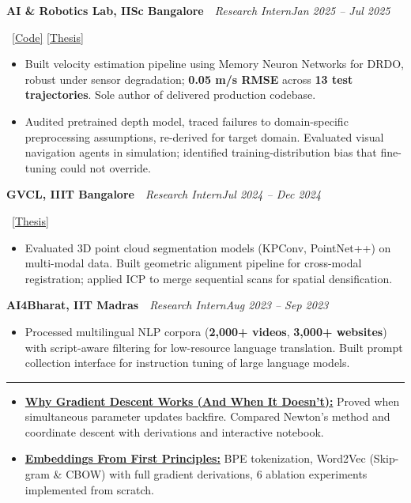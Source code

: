 \documentclass[10pt,a4paper]{article}
\newcommand{\cvsep}{\ \textemdash\ }
\newcommand{\cvsection}[1]{%
  \par\vspace{6.4pt}%
  \noindent{\normalsize\bfseries #1}\par\vspace{-8.6pt}%
  \noindent\rule{\textwidth}{0.4pt}\par\vspace{-2.4pt}%
}
\newcommand{\cvrole}[3]{%
  \par\vspace{1.6pt}%
  \noindent\textbf{#1}\cvsep{\itshape #2\hfill #3}\par
}
\begin{document}
\cvrole{AI \& Robotics Lab, IISc Bangalore}{Research Intern}{Jan 2025 -- Jul 2025}
%
\ {\footnotesize\href{https://github.com/codechitti216/AIRL_Work}{[Code]} \href{https://drive.google.com/file/d/12lxM_wQ9xsNQrMeVWLbBEVxs8huI3taH/view}{[Thesis]}}\par
\begin{itemize}
  \item Built velocity estimation pipeline using Memory Neuron Networks for DRDO, robust under sensor degradation; \textbf{0.05 m/s RMSE} across \textbf{13 test trajectories}. Sole author of delivered production codebase.
  \item Audited pretrained depth model, traced failures to domain-specific preprocessing assumptions, re-derived for target domain. Evaluated visual navigation agents in simulation; identified training-distribution bias that fine-tuning could not override.
\end{itemize}

\cvrole{GVCL, IIIT Bangalore}{Research Intern}{Jul 2024 -- Dec 2024}
%
\ {\footnotesize\href{https://drive.google.com/file/d/1NCWIILbvL6AOrhtrmfDbKl6pTAi8XbU6/view}{[Thesis]}}\par
\begin{itemize}
  \item Evaluated 3D point cloud segmentation models (KPConv, PointNet++) on multi-modal data. Built geometric alignment pipeline for cross-modal registration; applied ICP to merge sequential scans for spatial densification.
\end{itemize}

\cvrole{AI4Bharat, IIT Madras}{Research Intern}{Aug 2023 -- Sep 2023}
\par
\begin{itemize}
  \item Processed multilingual NLP corpora (\textbf{2,000+ videos}, \textbf{3,000+ websites}) with script-aware filtering for low-resource language translation. Built prompt collection interface for instruction tuning of large language models.
\end{itemize}

\cvsection{Technical Writing}
\begin{itemize}
  \item \href{https://codechitti216.github.io/notes/gradient-descent}{\textbf{Why Gradient Descent Works (And When It Doesn't):}} Proved when simultaneous parameter updates backfire. Compared Newton's method and coordinate descent with derivations and interactive notebook.
  \item \href{https://codechitti216.github.io/notes/embeddings}{\textbf{Embeddings From First Principles:}} BPE tokenization, Word2Vec (Skip-gram \& CBOW) with full gradient derivations, 6 ablation experiments implemented from scratch.
\end{itemize}
\end{document}
